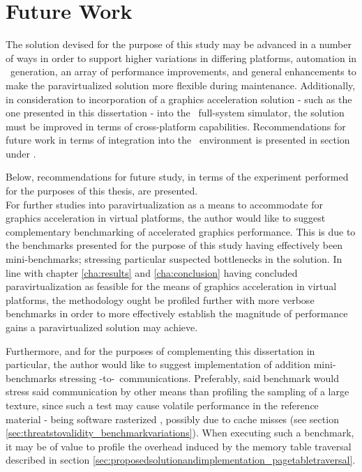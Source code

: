 
\chapter{Future Work}
\label{cha:futurework}
The solution devised for the purpose of this study may be advanced in a number of ways in order to support higher variations in differing platforms, automation in \dvttermabi\ generation, an array of performance improvements, and general enhancements to make the paravirtualized solution more flexible during maintenance.
Additionally, in consideration to incorporation of a graphics acceleration solution - such as the one presented in this dissertation - into the \dvttermsimics\ full-system simulator, the solution must be improved in terms of cross-platform capabilities.
Recommendations for future work in terms of integration into the \dvttermsimics\ environment is presented in section  under .

Below, recommendations for future study, in terms of the experiment performed for the purposes of this thesis, are presented.\\

\noindent
For further studies into paravirtualization as a means to accommodate for graphics acceleration in virtual platforms, the author would like to suggest complementary benchmarking of accelerated graphics performance.
This is due to the benchmarks presented for the purpose of this study having effectively been mini-benchmarks; stressing particular suspected bottlenecks in the solution.
In line with chapter \ref{cha:results} and \ref{cha:conclusion} having concluded paravirtualization as feasible for the means of graphics acceleration in virtual platforms, the methodology ought be profiled further with more verbose benchmarks in order to more effectively establish the magnitude of performance gains a paravirtualized solution may achieve.

Furthermore, and for the purposes of complementing this dissertation in particular, the author would like to suggest implementation of addition mini-benchmarks stressing \dvttermtarget -to-\dvttermhost\ communications.
Preferably, said benchmark would stress said communication by other means than profiling the sampling of a large texture, since such a test may cause volatile performance in the reference material - being software rasterized \dvttermsimics , possibly due to cache misses (see section \ref{sec:threatstovalidity_benchmarkvariations}).
When executing such a benchmark, it may be of value to profile the overhead induced by the memory table traversal described in section \ref{sec:proposedsolutionandimplementation_pagetabletraversal}.\\

